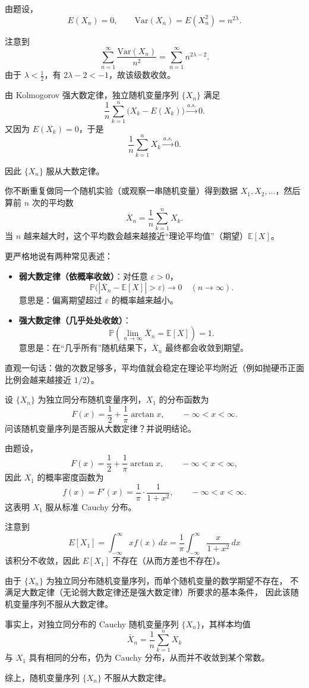 \begin{solution}
由题设，
\[
E(X_n)=0,
\qquad
\mathrm{Var}(X_n)=E(X_n^2)=n^{2\lambda}.
\]

注意到
\[
\sum_{n=1}^\infty \frac{\mathrm{Var}(X_n)}{n^2}
=\sum_{n=1}^\infty n^{2\lambda-2}.
\]
由于 $\lambda<\tfrac12$，有 $2\lambda-2<-1$，故该级数收敛。

由 Kolmogorov 强大数定律，独立随机变量序列 $\{X_n\}$ 满足
\[
\frac1n\sum_{k=1}^n \bigl(X_k-E(X_k)\bigr)\xrightarrow{a.s.}0.
\]
又因为 $E(X_k)=0$，于是
\[
\frac1n\sum_{k=1}^n X_k \xrightarrow{a.s.}0.
\]

因此 $\{X_n\}$ 服从大数定律。
\end{solution}
\begin{dxtips}
    你不断重复做同一个随机实验（或观察一串随机变量）得到数据 $X_1,X_2,\dots$，然后算前 $n$ 次的平均数
\[
\overline X_n=\frac1n\sum_{k=1}^n X_k.
\]
当 $n$ 越来越大时，这个平均数会越来越接近“理论平均值”（期望）$\mathbb E[X]$。

更严格地说有两种常见表述：

\begin{itemize}
  \item \textbf{弱大数定律（依概率收敛）}：对任意 $\varepsilon>0$，
  \[
  \mathbb P\big(|\overline X_n-\mathbb E[X]|>\varepsilon\big)\to 0\quad (n\to\infty).
  \]
  意思是：偏离期望超过 $\varepsilon$ 的概率越来越小。

  \item \textbf{强大数定律（几乎处处收敛）}：
  \[
  \mathbb P\left(\lim_{n\to\infty}\overline X_n=\mathbb E[X]\right)=1.
  \]
  意思是：在“几乎所有”随机结果下，$\overline X_n$ 最终都会收敛到期望。
\end{itemize}

直观一句话：做的次数足够多，平均值就会稳定在理论平均附近（例如抛硬币正面比例会越来越接近 $1/2$）。
\end{dxtips}
\begin{homework}[5.5]
设 $\{X_n\}$ 为独立同分布随机变量序列，$X_1$ 的分布函数为
\[
F(x)=\frac12 + \frac1\pi \arctan x , \qquad -\infty < x < \infty .
\]
问该随机变量序列是否服从大数定律？并说明结论。
\end{homework}
\begin{solution}
由题设，
\[
F(x)=\frac12+\frac{1}{\pi}\arctan x,\qquad -\infty<x<\infty,
\]
因此 $X_1$ 的概率密度函数为
\[
f(x)=F'(x)=\frac{1}{\pi}\cdot\frac{1}{1+x^2},\qquad -\infty<x<\infty.
\]
这表明 $X_1$ 服从标准 Cauchy 分布。

注意到
\[
E[X_1]=\int_{-\infty}^{\infty} x f(x)\,dx
=\frac{1}{\pi}\int_{-\infty}^{\infty}\frac{x}{1+x^2}\,dx
\]
该积分不收敛，因此 $E[X_1]$ 不存在（从而方差也不存在）。

由于 $\{X_n\}$ 为独立同分布随机变量序列，而单个随机变量的数学期望不存在，
不满足大数定律（无论弱大数定律还是强大数定律）所要求的基本条件，
因此该随机变量序列不服从大数定律。

事实上，对独立同分布的 Cauchy 随机变量序列 $\{X_n\}$，其样本均值
\[
\bar X_n=\frac{1}{n}\sum_{k=1}^n X_k
\]
与 $X_1$ 具有相同的分布，仍为 Cauchy 分布，从而并不收敛到某个常数。

综上，随机变量序列 $\{X_n\}$ 不服从大数定律。
\end{solution}
